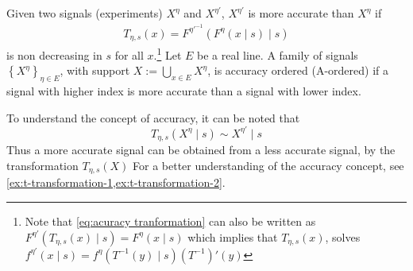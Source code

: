 \begin{definition}\label{def:accuracy}
\parencite{Persico2000Information} Given two signals (experiments) $X^{\eta}$ and $X^{\eta'}$,  $X^{\eta'}$ is more accurate than $X^{\eta}$ if
\begin{align}
    	T_{\eta,s}(x)=F^{\eta'^{-1}}(F^{\eta}(x\mid s)\mid s)\label{eq:acuracy tranformation}
\end{align}
is non decreasing in $s$ for all $x$.\footnote{Note that \cref{eq:acuracy tranformation} can also be written as $F^{\eta'}(T_{\eta,s}(x)\mid s)=F^{\eta}(x\mid s)$ which implies that $T_{\eta,s}(x)$, solves $f^{\eta'}(x\mid s)=f^\eta(T^{-1}(y)\mid s)(T^{-1})'(y)$} Let $E$ be a real line. A family of signals $\left \{ X^{\eta}\right \} _{\eta\in E}$, with support $X:=\bigcup_{x\in E}X^\eta$, is accuracy ordered (A-ordered) if a signal with higher index is more accurate than a signal with lower index.
\end{definition}

To understand the concept of accuracy, it can be noted that
\[
	T_{\eta,s}(X^{\eta}\mid s)\sim X^{\eta'}\mid s
\]
Thus a more accurate signal can be obtained from a less accurate signal, by the transformation $T_{\eta,s}(X)$  For a better understanding of the accuracy concept, see \cref{ex:t-transformation-1,ex:t-transformation-2}.

